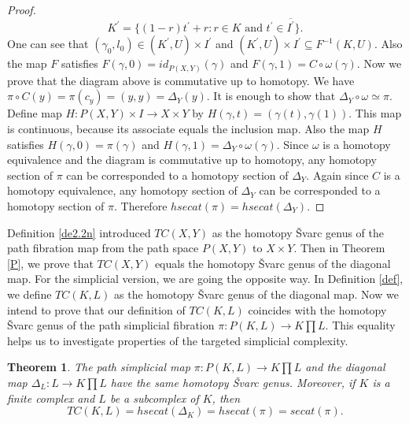 \documentclass[preprint,11pt %
]{hjm1}
\newtheorem{theorem}{Theorem}[section]
\theoremstyle{definition}
\begin{document}
\begin{proof}
\[
K^{'} =\lbrace (1-r)t^{'} +r: r\in K \text{ and } t^{'} \in \overline{I^{'}}\rbrace .
\]
One can see that $(\gamma _0,l_0)\in (K^{'},U)\times I^{'}$ and $(K^{'},U)\times I^{'}\subseteq F^{-1}(K,U)$.
Also the map $F$ satisfies $F(\gamma ,0)=id_{P(X,Y)}(\gamma )$ and $F(\gamma ,1)=C \circ \omega (\gamma )$.
Now we prove that the diagram above  is commutative up to homotopy. We have $\pi \circ C(y)=\pi (c_y)=(y,y)=\Delta _Y(y)$. It is enough to show that $\Delta _Y \circ \omega \simeq \pi $. Define map $H:P(X,Y)\times I\to X\times Y$ by $H(\gamma , t)=(\gamma (t),\gamma (1))$. This map is continuous, because  its associate equals the inclusion map.  
Also the map $H$ satisfies $H(\gamma , 0)=\pi (\gamma )$ and $H(\gamma ,1)=\Delta _Y\circ \omega (\gamma )$. Since $\omega$ is a homotopy equivalence and the diagram is commutative up to homotopy,  any homotopy section of $\pi$  can be corresponded to a homotopy section of $\Delta_Y$. Again since $C$ is a homotopy equivalence, any homotopy section of $\Delta_Y$  can be corresponded to a homotopy section of $\pi$.
Therefore $hsecat (\pi) = hsecat (\Delta_Y)$. 
\end{proof}




Definition \ref{de2.2n} introduced $TC(X,Y)$ as the homotopy \v{S}varc genus of the path fibration map from the path space $P(X, Y)$ to $X \times Y$.  Then in Theorem  \ref{P}, we prove that $TC(X,Y)$ equals the homotopy \v{S}varc genus of the diagonal map. For the simplicial version, we are going the opposite way. In Definition \ref{def}, we  define $TC(K,L)$ as the homotopy \v{S}varc genus of the diagonal map.
Now we intend to prove that our definition
 of $TC(K,L)$ coincides with the homotopy \v{S}varc genus of the path simplicial fibration $\pi: P(K,L) \to K \prod L$.
This equality helps us to investigate properties of the targeted simplicial complexity. 
 
 \begin{theorem}\label{i}
The path simplicial map $\pi: P(K,L) \to K  \prod L$ and the diagonal map $\Delta _{L}: L \to K \prod L$ have the same homotopy \v{S}varc genus. Moreover, if $K$ is a finite complex and $L$ be a subcomplex of $K$, then
\[
TC(K,L)  = hsecat(\Delta _{K})=hsecat (\pi) = secat(\pi).
\]
\end{theorem} 
\end{document}

